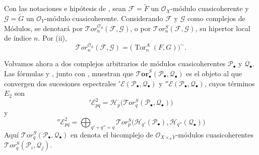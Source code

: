 \begin{env}[6.4.3]
\label{III.6.4.3}
Con las notaciones e hipótesis de , sean
$\mathscr F=\widetilde F$ un $\mathscr O_X$-módulo cuasicoherente y
$\mathscr G=\widetilde G$ un $\mathscr O_Y$-módulo cuasicoherente.
Considerando $\mathscr F$ y $\mathscr G$ como complejos de Módulos, se denotará por $\mathscr{T}\!or_n^{\mathscr O_S}(\mathscr F,\mathscr G)$, o
por $\mathscr{T}\!or_n^S(\mathscr F,\mathscr G)$, su hipertor local de índice $n$.
Por (ii),
\[
  \mathscr{T}\!or_n^{\mathscr O_S}(\mathscr F,\mathscr G)
  =\bigl(\operatorname{Tor}_n^A(F,G)\bigr)^{\sim}.
  \tag{6.4.3.1}\label{III.6.4.3.1.fr}
\]

Volvamos ahora a dos complejos arbitrarios de módulos
cuasicoherentes $\mathscr P_\bullet$ y $\mathscr Q_\bullet$. Las fórmulas
 y , junto con
, muestran que
$\boldsymbol{\mathscr{T}\!or}_\bullet^S(\mathscr P_\bullet,\mathscr Q_\bullet)$ es el objeto al
que convergen dos sucesiones espectrales
$'\mathscr E(\mathscr P_\bullet,\mathscr Q_\bullet)$ y
$''\mathscr E(\mathscr P_\bullet,\mathscr Q_\bullet)$, cuyos términos $E_2$ son
\[
  '\mathscr E_{pq}^2
  =\mathscr H_p\bigl(\mathscr{T}\!or_q^S
    (\mathscr P_\bullet,\mathscr Q_\bullet)\bigr)
  \tag{6.4.3.2}\label{III.6.4.3.2.fr}
\]
y
\[
  ''\mathscr E_{pq}^2
  =\bigoplus_{q'+q''=q}
  \mathscr{T}\!or_p^S
  \bigl(\mathscr H_{q'}(\mathscr P_\bullet),
        \mathscr H_{q''}(\mathscr Q_\bullet)\bigr)
  \tag{6.4.3.3}\label{III.6.4.3.3.fr}
\]
Aquí $\mathscr{T}\!or_q^S(\mathscr P_\bullet,\mathscr Q_\bullet)$ en
 denota el bicomplejo de
$\mathscr O_{X\times_S Y}$-módulos cuasicoherentes
$\mathscr{T}\!or_q^S(\mathscr P_i,\mathscr Q_j)$.
\end{env}

